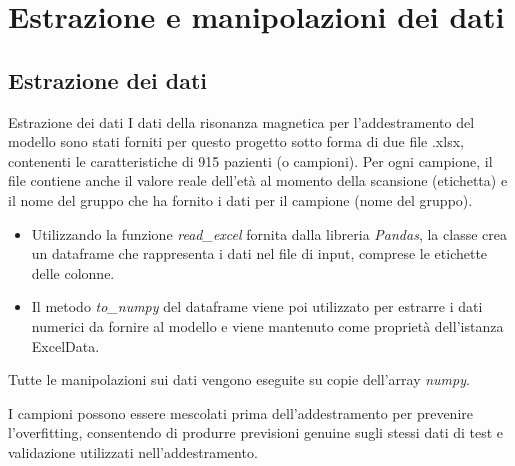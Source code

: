 \documentclass{beamer}
\begin{document}

\section{Estrazione e manipolazioni dei dati}
\subsection*{Estrazione dei dati}
\begin{frame}{Estrazione dei dati}
I dati della risonanza magnetica per l'addestramento del modello sono stati forniti per questo progetto sotto forma di due file .xlsx, contenenti le caratteristiche di 915 pazienti (o campioni). Per ogni campione, il file contiene anche il valore reale dell'età al momento della scansione (etichetta) e il nome del gruppo che ha fornito i dati per il campione (nome del gruppo).
\pause
\begin{itemize}
\item Utilizzando la funzione \emph{read\_excel} fornita dalla libreria \emph{Pandas}, la classe crea un dataframe che rappresenta i dati nel file di input, comprese le etichette delle colonne.
\pause
\item Il metodo \emph{to\_numpy} del dataframe viene poi utilizzato per estrarre i dati numerici da fornire al modello e viene mantenuto come proprietà dell'istanza ExcelData.
\end{itemize}
\pause
Tutte le manipolazioni sui dati vengono eseguite su copie dell'array \emph{numpy}.

I campioni possono essere mescolati prima dell'addestramento per prevenire l'overfitting, consentendo di produrre previsioni genuine sugli stessi dati di test e validazione utilizzati nell'addestramento.
\end{frame}


\end{document}
